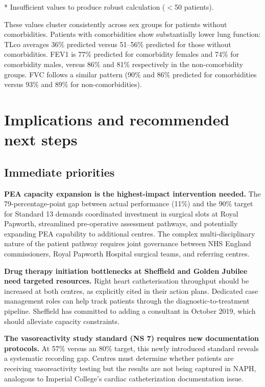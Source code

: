 \documentclass[11pt,a4paper]{article}
\begin{document}
* Insufficient values to produce robust calculation ($<$50 patients).

These values cluster consistently across sex groups for patients without comorbidities. Patients with comorbidities show substantially lower lung function: TLco averages 36\% predicted versus 51--56\% predicted for those without comorbidities. FEV1 is 77\% predicted for comorbidity females and 74\% for comorbidity males, versus 86\% and 81\% respectively in the non-comorbidity groups. FVC follows a similar pattern (90\% and 86\% predicted for comorbidities versus 93\% and 89\% for non-comorbidities).

\section{Implications and recommended next steps}

\subsection{Immediate priorities}

\textbf{PEA capacity expansion is the highest-impact intervention needed.} The 79-percentage-point gap between actual performance (11\%) and the 90\% target for Standard 13 demands coordinated investment in surgical slots at Royal Papworth, streamlined pre-operative assessment pathways, and potentially expanding PEA capability to additional centres. The complex multi-disciplinary nature of the patient pathway requires joint governance between NHS England commissioners, Royal Papworth Hospital surgical teams, and referring centres.

\textbf{Drug therapy initiation bottlenecks at Sheffield and Golden Jubilee need targeted resources.} Right heart catheterisation throughput should be increased at both centres, as explicitly cited in their action plans. Dedicated case management roles can help track patients through the diagnostic-to-treatment pipeline. Sheffield has committed to adding a consultant in October 2019, which should alleviate capacity constraints.

\textbf{The vasoreactivity study standard (NS 7) requires new documentation protocols.} At 57\% versus an 80\% target, this newly introduced standard reveals a systematic recording gap. Centres must determine whether patients are receiving vasoreactivity testing but the results are not being captured in NAPH, analogous to Imperial College's cardiac catheterization documentation issue.
\end{document}
